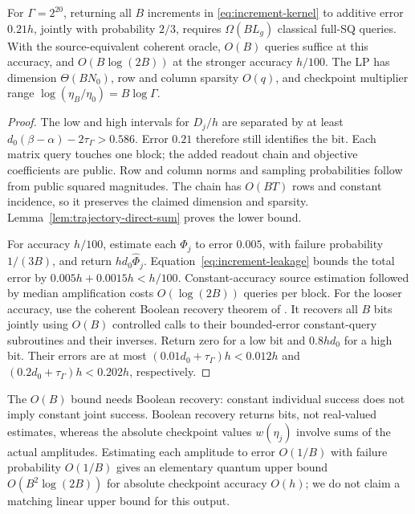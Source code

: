 \begin{theorem}\label{thm:lp-trajectory}
For $\Gamma=2^{20}$, returning all $B$ increments in
\eqref{eq:increment-kernel} to additive error $0.21h$, jointly with
probability $2/3$, requires $\Omega(BL_g)$ classical full-SQ queries.
With the source-equivalent coherent oracle, $O(B)$ queries suffice at this accuracy,
and $O(B\log(2B))$ at the stronger accuracy $h/100$.  The LP has dimension
$\Theta(BN_0)$, row and column sparsity $O(q)$, and checkpoint multiplier
range $\log(\eta_B/\eta_0)=B\log\Gamma$.
\end{theorem}
\begin{proof}
The low and high intervals for $D_j/h$ are separated by at least
$d_0(\beta-\alpha)-2\tau_\Gamma>0.586$.  Error $0.21$ therefore still
identifies the bit.  Each matrix query touches one block; the added
readout chain and objective coefficients are public.  Row and column
norms and sampling probabilities follow from public squared magnitudes.
The chain has $O(BT)$ rows and constant incidence, so it preserves the
claimed dimension and sparsity.  Lemma~\ref{lem:trajectory-direct-sum}
proves the lower bound.

For accuracy $h/100$, estimate each $\Phi_j$ to error $0.005$, with
failure probability $1/(3B)$, and return $hd_0\widehat\Phi_j$.
Equation~\eqref{eq:increment-leakage} bounds the total error by
$0.005h+0.0015h<h/100$.  Constant-accuracy source estimation followed by
median amplification costs $O(\log(2B))$ queries per block.
For the looser accuracy, use the coherent Boolean recovery theorem of
\citet[Corollary~3]{BuhrmanEtAl2007}.  It recovers all $B$ bits jointly
using $O(B)$ controlled calls to their bounded-error constant-query
subroutines and their inverses.  Return zero for a low bit and
$0.8hd_0$ for a high bit.  Their errors are at most
$(0.01d_0+\tau_\Gamma)h<0.012h$ and
$(0.2d_0+\tau_\Gamma)h<0.202h$, respectively.
\end{proof}

The $O(B)$ bound needs Boolean recovery: constant individual success
does not imply constant joint success.  Boolean recovery returns bits,
not real-valued estimates, whereas the absolute checkpoint values
$w(\eta_j)$ involve sums of the actual amplitudes.  Estimating each
amplitude to error $O(1/B)$ with failure probability $O(1/B)$ gives an
elementary quantum upper bound $O(B^2\log(2B))$ for absolute checkpoint
accuracy $O(h)$; we do not claim a matching linear upper bound for this
output.

